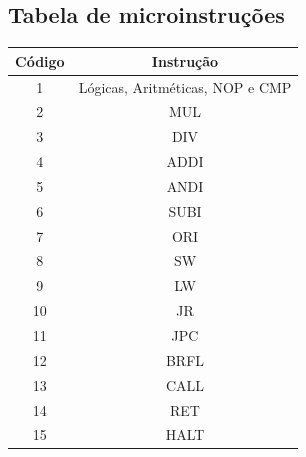     		\subsection{Tabela de microinstruções}

	\begin{center}
		\begin{longtable}[pos]{| c | c |} \hline
			\multicolumn{1}{|c|}{\cellcolor[gray]{0.9}\textbf{Código}} & 
			\multicolumn{1}{c|}{\cellcolor[gray]{0.9}\textbf{Instrução}} \\ \hline 
			\endhead
			\hline
			\endlastfoot
			
	    1 & Lógicas, Aritméticas, NOP e CMP\\ \hline
            2 & MUL \\ \hline
            3 & DIV \\ \hline
            4 & ADDI \\ \hline
            5 & ANDI \\ \hline
            6 & SUBI \\ \hline
            7 & ORI \\ \hline
            8 & SW \\ \hline
            9 & LW \\ \hline
            10 & JR\\ \hline
            11 & JPC\\ \hline
            12 & BRFL\\ \hline
            13 & CALL\\ \hline
            14 & RET\\ \hline
            15 & HALT\\ \hline
		\end{longtable}
	\end{center}

